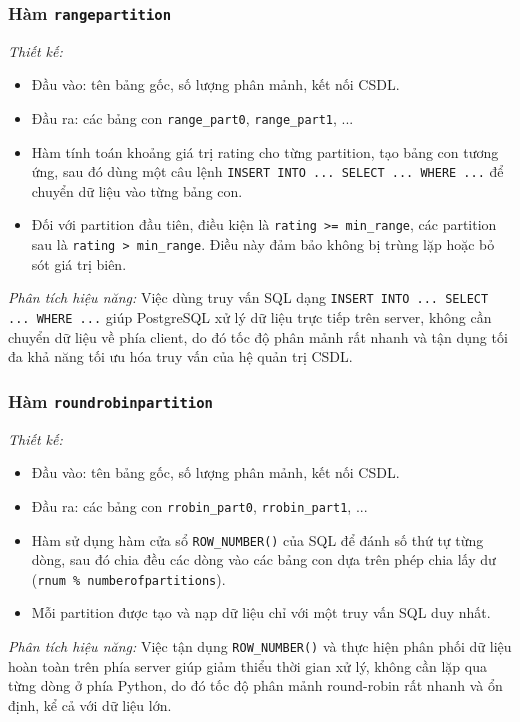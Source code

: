 \documentclass[14pt]{extarticle}
\begin{document}
\subsubsection{Hàm \texttt{rangepartition}}

\textit{Thiết kế:}
\begin{itemize}
    \item Đầu vào: tên bảng gốc, số lượng phân mảnh, kết nối CSDL.
    \item Đầu ra: các bảng con \texttt{range\_part0}, \texttt{range\_part1}, ...
    \item Hàm tính toán khoảng giá trị rating cho từng partition, tạo bảng con tương ứng, sau đó dùng một câu lệnh \texttt{INSERT INTO ... SELECT ... WHERE ...} để chuyển dữ liệu vào từng bảng con.
    \item Đối với partition đầu tiên, điều kiện là \texttt{rating >= min\_range}, các partition sau là \texttt{rating > min\_range}. Điều này đảm bảo không bị trùng lặp hoặc bỏ sót giá trị biên.
\end{itemize}
\textit{Phân tích hiệu năng:}  
Việc dùng truy vấn SQL dạng \texttt{INSERT INTO ... SELECT ... WHERE ...} giúp PostgreSQL xử lý dữ liệu trực tiếp trên server, không cần chuyển dữ liệu về phía client, do đó tốc độ phân mảnh rất nhanh và tận dụng tối đa khả năng tối ưu hóa truy vấn của hệ quản trị CSDL.


\subsubsection{Hàm \texttt{roundrobinpartition}}

\textit{Thiết kế:}
\begin{itemize}
    \item Đầu vào: tên bảng gốc, số lượng phân mảnh, kết nối CSDL.
    \item Đầu ra: các bảng con \texttt{rrobin\_part0}, \texttt{rrobin\_part1}, ...
    \item Hàm sử dụng hàm cửa sổ \texttt{ROW\_NUMBER()} của SQL để đánh số thứ tự từng dòng, sau đó chia đều các dòng vào các bảng con dựa trên phép chia lấy dư (\texttt{rnum \% numberofpartitions}).
    \item Mỗi partition được tạo và nạp dữ liệu chỉ với một truy vấn SQL duy nhất.
\end{itemize}
\textit{Phân tích hiệu năng:}  
Việc tận dụng \texttt{ROW\_NUMBER()} và thực hiện phân phối dữ liệu hoàn toàn trên phía server giúp giảm thiểu thời gian xử lý, không cần lặp qua từng dòng ở phía Python, do đó tốc độ phân mảnh round-robin rất nhanh và ổn định, kể cả với dữ liệu lớn.
\end{document}
